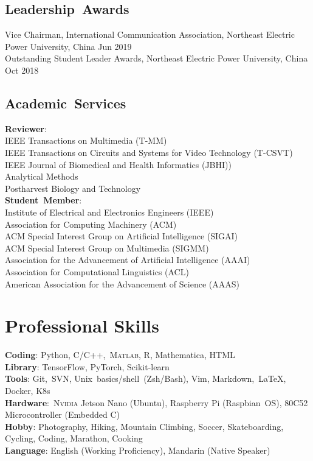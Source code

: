 \documentclass{my_cv}
\begin{document}
\subsection{\textbf{Leadership~Awards}}
\noindent Vice Chairman, International Communication Association, Northeast Electric Power University, China \hfill Jun 2019 \\
Outstanding Student Leader Awards, Northeast Electric Power University, China \hfill Oct 2018

\subsection{\textbf{Academic~Services}}
\noindent \textbf{Reviewer}:\\
IEEE Transactions on Multimedia (T-MM)\\
IEEE Transactions on Circuits and Systems for Video Technology (T-CSVT)\\
IEEE Journal of Biomedical and Health Informatics (JBHI))\\
Analytical Methods\\
Postharvest Biology and Technology\\

\noindent \textbf{Student~Member}:\\
Institute of Electrical and Electronics Engineers (IEEE)\\
Association for Computing Machinery (ACM)\\
ACM Special Interest Group on Artificial Intelligence (SIGAI)\\
ACM Special Interest Group on Multimedia (SIGMM)\\
Association for the Advancement of Artificial Intelligence (AAAI)\\
Association for Computational Linguistics (ACL)\\
American Association for the Advancement of Science (AAAS)

\hspace*{\fill}


\section{\textbf{Professional Skills}}
\noindent \textbf{Coding}: Python, C/C++,~\textsc{Matlab}, R, Mathematica, HTML \\
\textbf{Library}: TensorFlow, PyTorch, Scikit-learn \\
\textbf{Tools}: Git,~\textsc{SVN}, Unix~basics/shell~(Zsh/Bash), Vim, Markdown,~\LaTeX, Docker, K8s \\
\textbf{Hardware}:~\textsc{Nvidia} Jetson Nano (Ubuntu),  Raspberry  Pi 
 (Raspbian~\textsc{OS}), 80C52 Microcontroller (Embedded C) \\
\textbf{Hobby}: Photography, Hiking, Mountain Climbing, Soccer, Skateboarding, Cycling, Coding, Marathon, Cooking\\
\textbf{Language}: English (Working Proficiency), Mandarin (Native Speaker)
\end{document}
